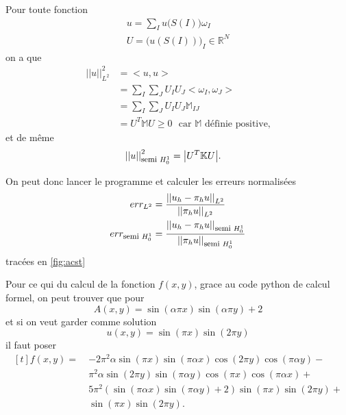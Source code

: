 \documentclass[11pt]{article}
\newcommand{\smbox}[1]{\mbox{\footnotesize #1}}
\newcommand{\R}{\mathbb{R}}
\newcommand{\K}{\mathbb{K}}
\newcommand{\M}{\mathbb{M}}
\newcommand{\ms}{~~~}
\newcommand{\norm}[1]{\left|\left|#1\right|\right|}
\begin{document}
Pour toute fonction
\begin{align}
  u = \sum_I u\big(S(I)\big) \omega_I \\
  U = \big(u(S(I))\big)_I \in \R^{ N}
\end{align}
on a que
\begin{align}
  \norm{u}_{L^2}^2 &= \big<u, u\big> \\
                   &= \sum_I \sum_J U_I U_J \big< \omega_I, \omega_J\big> \\
                   &= \sum_I \sum_J U_I U_J \M_{IJ} \\
                   &= U^T \M U \geq 0 \ms \mbox{car $\M$ définie positive,}
\end{align}
et de même
\begin{align}
  \norm{u}_{\smbox{semi~} H^1_0}^2 &= \big|U^T \K U \big|.
\end{align}

On peut donc lancer le programme et calculer les erreurs normalisées
\begin{align}
  err_{L^2} &= \frac{\norm{u_h-\pi_h u}_{L^2}}{\norm{\pi_h u}_{L^2}} \\
  err_{\smbox{semi~} H^1_0} &= \frac{\norm{u_h-\pi_h u}_{\smbox{semi~}H^1_0}}{\norm{\pi_h u}_{\smbox{semi~}H^1_0}} 
\end{align}
tracées en \autoref{fig:acst}

Pour ce qui du calcul de la fonction $f(x,y)$, grace au code python de calcul formel, on peut trouver que pour
\begin{equation}
  A(x,y)= \sin(\alpha \pi x)\sin(\alpha \pi y) + 2
\end{equation}
et si on veut garder comme solution
\begin{equation}
  u(x,y)=\sin(\pi x)\sin(2\pi y)
\end{equation}
il faut poser
\begin{equation}
  \begin{aligned}[t]
    f(x,y) =~&- 2 \pi^2 \alpha \sin(\pi x) \sin(\pi \alpha x) \cos(2 \pi y) \cos(\pi \alpha y) - \\
    &\pi^2 \alpha \sin(2 \pi y) \sin(\pi \alpha y) \cos(\pi x) \cos(\pi \alpha x) + \\
    &5 \pi^2 (\sin(\pi \alpha x) \sin(\pi \alpha y) + 2) \sin(\pi x) \sin(2 \pi y) + \\
    &\sin(\pi x) \sin(2 \pi y).
  \end{aligned}
\end{equation}
\end{document}
